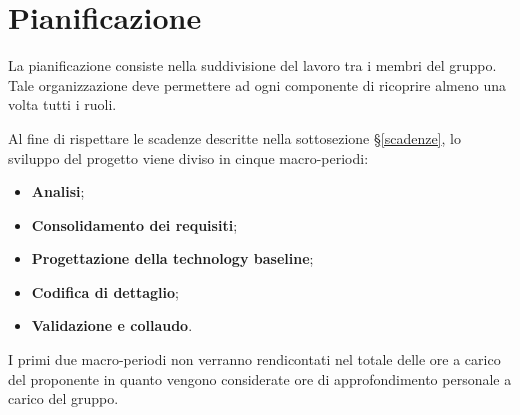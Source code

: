 \documentclass[../piano-di-progetto.tex]{subfiles}
\begin{document}
\section{Pianificazione}
\label{section:pian}

La pianificazione consiste nella suddivisione del lavoro tra i membri del gruppo. Tale organizzazione deve permettere ad ogni componente di ricoprire almeno una volta tutti i ruoli.

Al fine di rispettare le scadenze descritte nella sottosezione \S\ref{scadenze}, lo sviluppo del progetto viene diviso in cinque macro-periodi:
\begin{itemize}
    \item \textbf{Analisi};
    \item \textbf{Consolidamento dei requisiti};
    \item \textbf{Progettazione della technology baseline};
    \item \textbf{Codifica di dettaglio};
    \item \textbf{Validazione e collaudo}.
\end{itemize}
I primi due macro-periodi non verranno rendicontati nel totale delle ore a carico del proponente in quanto vengono considerate ore di approfondimento personale a carico del gruppo.






\end{document}
